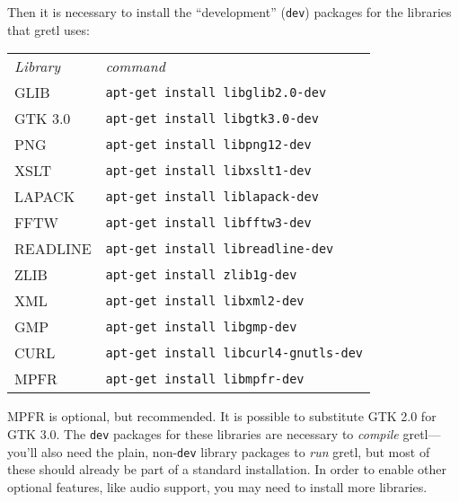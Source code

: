 Then it is necessary to install the ``development'' (\texttt{dev})
packages for the libraries that gretl uses: 
\begin{center}
  \begin{tabular}{ll}
    \textit{Library} & \textit{command} \\ [4pt]
    GLIB     & \texttt{apt-get install libglib2.0-dev} \\
    GTK 3.0  & \texttt{apt-get install libgtk3.0-dev} \\
    PNG      & \texttt{apt-get install libpng12-dev} \\
    XSLT     & \texttt{apt-get install libxslt1-dev} \\
    LAPACK   & \texttt{apt-get install liblapack-dev} \\
    FFTW     & \texttt{apt-get install libfftw3-dev} \\
    READLINE & \texttt{apt-get install libreadline-dev} \\
    ZLIB     & \texttt{apt-get install zlib1g-dev} \\
    XML      & \texttt{apt-get install libxml2-dev} \\
    GMP      & \texttt{apt-get install libgmp-dev} \\
    CURL     & \texttt{apt-get install libcurl4-gnutls-dev} \\
    MPFR     & \texttt{apt-get install libmpfr-dev}
  \end{tabular}
\end{center}

MPFR is optional, but recommended. It is possible to substitute GTK
2.0 for GTK 3.0.  The \texttt{dev} packages for these libraries are
necessary to \emph{compile} gretl---you'll also need the
plain, non-\texttt{dev} library packages to \emph{run} gretl,
but most of these should already be part of a standard installation.
In order to enable other optional features, like audio support, you
may need to install more libraries.


